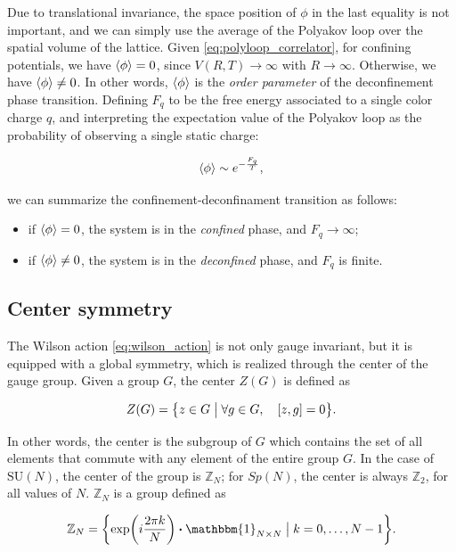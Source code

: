 \documentclass[reqno,12pt]{article}
\numberwithin{equation}{section}
\newcommand{\SU}{\mathrm{SU}}
\newcommand{\id}{\mathbbm{1}}
\begin{document}
Due to translational invariance, the space position of $\phi$ in the last equality is not important, and we can simply
use the average of the Polyakov loop over the spatial volume of the lattice. Given \eqref{eq:polyloop_correlator}, for 
confining potentials, we have $\expval{\phi} = 0$, since $V(R, T) \rightarrow \infty$ with $R \rightarrow \infty$. Otherwise,
we have $\expval{\phi} \neq 0$. In other words, $\expval{\phi}$ is the \textit{order parameter} of the deconfinement phase
transition. Defining $F_q$ to be the free energy associated to a single color charge $q$, and interpreting the expectation
value of the Polyakov loop as the probability of observing a single static charge:

\begin{equation}
	\expval{\phi} \sim e^{-\frac{F_q}{T}},
\end{equation}

we can summarize the confinement-deconfinament transition as follows:

\begin{itemize}
	\item if $\expval{\phi} = 0$, the system is in the \textit{confined} phase, and $F_q \rightarrow \infty$;
	\item if $\expval{\phi} \neq 0$, the system is in the \textit{deconfined} phase, and $F_q$ is finite.
\end{itemize}

\subsection{Center symmetry} \label{center}

The Wilson action \eqref{eq:wilson_action} is not only gauge invariant, but it is equipped with a global symmetry, which
is realized through the center of the gauge group. Given a group $G$, the center $Z(G)$ is defined as

\begin{equation}
	Z(G) = \qty{z \in G \bigm| \forall g \in G \qc [z, g] = 0}.
\end{equation}

In other words, the center is the subgroup of $G$ which contains the set of all elements that commute with any element of the
entire group $G$. In the case of $\SU(N)$, the center of the group is $\mathbb{Z}_N$; for $Sp(N)$, the center is always
$\mathbb{Z}_2$, for all values of $N$. $\mathbb{Z}_N$ is a group defined as

\begin{equation}
	\mathbb{Z}_N = \qty{\exp(i \frac{2\pi k}{N}) \vdot \id_{N\times N} \bigm| k = 0, \dots, N - 1 }.
\end{equation}
\end{document}
